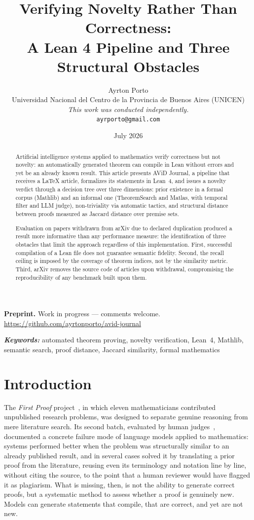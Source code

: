 \documentclass{article}
\title{Verifying Novelty Rather Than Correctness:\\
A Lean 4 Pipeline and Three Structural Obstacles}
\author{
  Ayrton Porto\\
  \small
  Universidad Nacional del Centro de la Provincia de Buenos Aires (UNICEN)\\
  \small\textit{This work was conducted independently.}\\
  \texttt{ayrporto@gmail.com}
}
\date{July 2026}
\theoremstyle{remark}
\providecommand{\keywords}[1]{\par\addvspace{\medskipamount}
\noindent\textbf{\emph{Keywords:}} #1\par}
\begin{document}
\maketitle

\begin{center}
\small
\textbf{Preprint.} Work in progress --- comments welcome.\\
\url{https://github.com/ayrtonporto/avid-journal}
\end{center}

\begin{abstract}
Artificial intelligence systems applied to mathematics verify correctness but not novelty: an automatically generated theorem can compile in Lean without errors and yet be an already known result. This article presents AViD Journal, a pipeline that receives a LaTeX article, formalizes its statements in Lean~4, and issues a novelty verdict through a decision tree over three dimensions: prior existence in a formal corpus (Mathlib) and an informal one (TheoremSearch and Matlas, with temporal filter and LLM judge), non-triviality via automatic tactics, and structural distance between proofs measured as Jaccard distance over premise sets.

Evaluation on papers withdrawn from arXiv due to declared duplication produced a result more informative than any performance measure: the identification of three obstacles that limit the approach regardless of this implementation. First, successful compilation of a Lean file does not guarantee semantic fidelity. Second, the recall ceiling is imposed by the coverage of theorem indices, not by the similarity metric. Third, arXiv removes the source code of articles upon withdrawal, compromising the reproducibility of any benchmark built upon them.
\end{abstract}

\keywords{automated theorem proving, novelty verification, Lean~4, Mathlib, semantic search, proof distance, Jaccard similarity, formal mathematics}
\section{Introduction}

The \textit{First Proof} project~\cite{abouzaid2026}, in which eleven mathematicians contributed unpublished research problems, was designed to separate genuine reasoning from mere literature search. Its second batch, evaluated by human judges~\cite{firstproof2b}, documented a concrete failure mode of language models applied to mathematics: systems performed better when the problem was structurally similar to an already published result, and in several cases solved it by translating a prior proof from the literature, reusing even its terminology and notation line by line, without citing the source, to the point that a human reviewer would have flagged it as plagiarism. What is missing, then, is not the ability to generate correct proofs, but a systematic method to assess whether a proof is genuinely new. Models can generate statements that compile, that are correct, and yet are not new.
\end{document}
